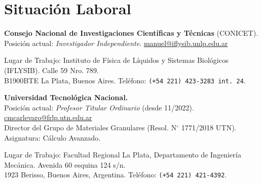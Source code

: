\section*{Situación Laboral}

 \textbf{Consejo Nacional de Investigaciones Científicas y Técnicas} (CONICET). \\Posición actual: \textit{Investigador Independiente}. \faEnvelopeO{} \href{mailto:manuel@iflysib.unlp.edu.ar}{manuel@iflysib.unlp.edu.ar}

  Lugar de Trabajo: Instituto de Física de Líquidos y Sistemas Biológicos (IFLYSIB). Calle 59 Nro. 789.\\ B1900BTE  La Plata, Buenos Aires. Teléfono: \texttt{(+54 221) 423-3283 int. 24}.

   \textbf{Universidad Tecnológica Nacional.} \\
Posición actual: \textit{Profesor Titular Ordinario} (desde 11/2022). \faEnvelopeO{} \href{mailto:manuel@iflysib.unlp.edu.ar}{cmcarlevaro@frlp.utn.edu.ar} \\
Director del Grupo de Materiales Granulares (Resol. N$^\circ$ 1771/2018 UTN).\\
Asignatura: Cálculo Avanzado.

Lugar de Trabajo: Facultad Regional La Plata, Departamento de Ingeniería Mecánica. Avenida 60 esquina 124 s/n. \\1923 Berisso, Buenos Aires, Argentina. Teléfono: \texttt{(+54 221) 421-4392}.

  
% 
